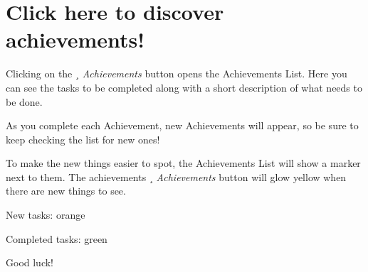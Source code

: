 \chapter{Click here to discover achievements! }
\hypertarget{md__mono_engine_2thirdparty_2tracy_2profiler_2src_2achievements_2_intro}{}\label{md__mono_engine_2thirdparty_2tracy_2profiler_2src_2achievements_2_intro}
\label{md__mono_engine_2thirdparty_2tracy_2profiler_2src_2achievements_2_intro_autotoc_md1111}%
%


Clicking on the {\itshape  Achievements} button opens the Achievements List. Here you can see the tasks to be completed along with a short description of what needs to be done.

As you complete each Achievement, new Achievements will appear, so be sure to keep checking the list for new ones!

To make the new things easier to spot, the Achievements List will show a marker next to them. The achievements {\itshape  Achievements} button will glow yellow when there are new things to see.


\begin{DoxyItemize}
\item New tasks:\+ orange 
\item Completed tasks:\+ green 
\end{DoxyItemize}

Good luck! 
